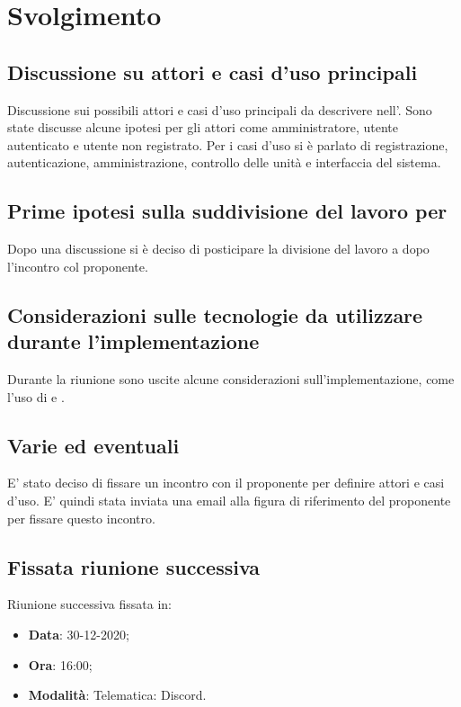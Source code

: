 \documentclass[]{article}
\begin{document}
	\newpage

	\section{Svolgimento}
		\subsection{Discussione su attori e casi d'uso principali}
        Discussione sui possibili attori e casi d'uso principali da descrivere nell'. Sono state discusse alcune ipotesi per gli attori come amministratore, utente autenticato e utente non registrato. Per i casi d'uso si è parlato di registrazione, autenticazione, amministrazione, controllo delle unità e interfaccia del sistema.

        \subsection{Prime ipotesi sulla suddivisione del lavoro per }
        Dopo una discussione si è deciso di posticipare la divisione del lavoro a dopo l'incontro col proponente.
        
        \subsection{Considerazioni sulle tecnologie da utilizzare durante l'implementazione}
        Durante la riunione sono uscite alcune considerazioni sull'implementazione, come l'uso di  e .
        
        \subsection{Varie ed eventuali}
        E' stato deciso di fissare un incontro con il proponente per definire attori e casi d'uso. E' quindi stata inviata una email alla figura di riferimento del proponente per fissare questo incontro.

		\subsection{Fissata riunione successiva}
		Riunione successiva fissata in:
		\begin{itemize}
			\item \textbf{Data}: 30-12-2020;
			\item \textbf{Ora}: 16:00;
			\item \textbf{Modalità}: Telematica: Discord.
		\end{itemize}
\end{document}
